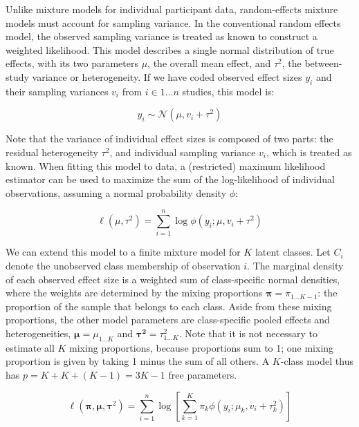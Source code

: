 \documentclass[
  english,
  man, noextraspace,floatsintext]{apa6}
\begin{document}
Unlike mixture models for individual participant data, random-effects mixture models must account for sampling variance.
In the conventional random effects model, the observed sampling variance is treated as known to construct a weighted likelihood.
This model describes a single normal distribution of true effects, with its two parameters \(\mu\), the overall mean effect, and \(\tau^2\), the between-study variance or heterogeneity.
If we have coded observed effect sizes \(y_i\) and their sampling variances \(v_i\) from \(i \in 1 \ldots n\) studies, this model is:

\begin{equation}
y_i \sim \mathcal{N}(\mu,v_i+\tau^2)
\end{equation}

Note that the variance of individual effect sizes is composed of two parts: the residual heterogeneity \(\tau^2\), and individual sampling variance \(v_i\), which is treated as known.
When fitting this model to data, a (restricted) maximum likelihood estimator can be used to maximize the sum of the log-likelihood of individual observations, assuming a normal probability density \(\phi\):

\begin{equation}
\ell(\mu, \tau^2) = \sum_{i=1}^{n} \log \phi(y_i; \mu, v_i +\tau^2)
\end{equation}

We can extend this model to a finite mixture model for \(K\) latent classes.
Let \(C_i\) denote the unobserved class membership of observation \(i\).
The marginal density of each observed effect size is a weighted sum of class-specific normal densities, where the weights are determined by the mixing proportions \(\boldsymbol{\pi} = \pi_{1 \ldots K-1}\):
the proportion of the sample that belongs to each class.
Aside from these mixing proportions, the other model parameters are class-specific pooled effects and heterogeneities, \(\boldsymbol{\mu} = \mu_{1 \ldots K}\) and \(\boldsymbol{\tau^2} = \tau^2_{1 \ldots K}\).
Note that it is not necessary to estimate all \(K\) mixing proportions, because proportions sum to 1; one mixing proportion is given by taking 1 minus the sum of all others.
A \(K\)-class model thus has \(p=K+K+(K-1)=3K-1\) free parameters.

\begin{equation}
\ell(\boldsymbol{\pi}, \boldsymbol{\mu}, \boldsymbol{\tau}^2) =
\sum_{i=1}^{n}
\log
\left[\sum_{k=1}^{K} \pi_k \phi(y_i; \mu_k, v_i + \tau_k^2) \right]
\end{equation}
\end{document}
